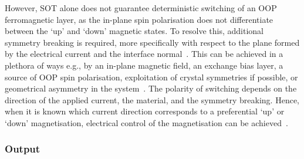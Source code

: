 However, SOT alone does not guarantee deterministic switching of an OOP ferromagnetic layer, as the in-plane spin polarisation does not differentiate between the `up' and `down' magnetic states.
To resolve this, additional symmetry breaking is required, more specifically with respect to the plane formed by the electrical current and the interface normal~\cite{SOT_Roadmap}.
This can be achieved in a plethora of ways e.g., by an in-plane magnetic field, an exchange bias layer, a source of OOP spin polarisation, exploitation of crystal symmetries if possible, or geometrical asymmetry in the system~\cite{SOT_firstprinciplesCoPt,SOT_Roadmap}.
The polarity of switching depends on the direction of the applied current, the material, and the symmetry breaking.
Hence, when it is known which current direction corresponds to a preferential `up' or `down' magnetisation, electrical control of the magnetisation can be achieved~\cite{SOT_PMAinsulator}.

\subsubsection{Output}
